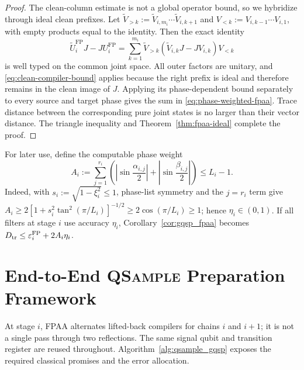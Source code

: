\documentclass[10pt,conference]{IEEEtran}
\theoremstyle{plain}
\theoremstyle{remark}
\begin{document}
\begin{proof}
The clean-column estimate is not a global operator bound, so we
hybridize through ideal clean prefixes.  Let
\(\widetilde V_{>k}:=\widetilde V_{i,m_i}\cdots
\widetilde V_{i,k+1}\) and
\(V_{<k}:=V_{i,k-1}\cdots V_{i,1}\), with empty products equal to
the identity.  Then the exact identity
\[
\widetilde U_i^{\mathrm{FP}}J-JU_i^{\mathrm{FP}}
=\sum_{k=1}^{m_i}
\widetilde V_{>k}(\widetilde V_{i,k}J-JV_{i,k})V_{<k}
\]
is well typed on the common joint space.  All outer factors are
unitary, and \eqref{eq:clean-compiler-bound} applies because the
right prefix is ideal and therefore remains in the clean image of
\(J\).  Applying its phase-dependent bound separately to every
source and target phase gives the sum in
\eqref{eq:phase-weighted-fpaa}.
Trace distance between the corresponding pure joint states is no
larger than their vector distance.  The triangle inequality and
Theorem~\ref{thm:fpaa-ideal} complete the proof.
\end{proof}

For later use, define the computable phase weight
\begin{equation}
\label{eq:phase-weight}
A_i:=
\sum_{j=1}^{r_i}\left(
\left|\sin\frac{\alpha_{i,j}}2\right|
+\left|\sin\frac{\beta_{i,j}}2\right|\right)
\leq L_i-1.
\end{equation}
Indeed, with \(s_i:=\sqrt{1-\xi_i^2}\leq1\), phase-list symmetry and
the \(j=r_i\) term give
\(A_i\geq2[1+s_i^2\tan^2(\pi/L_i)]^{-1/2}
\geq2\cos(\pi/L_i)\geq1\); hence \(\eta_i\in(0,1)\).
If all filters at stage \(i\) use accuracy \(\eta_i\),
Corollary~\ref{cor:gqsp_fpaa} becomes
\(D_{\rm tr}\leq\varepsilon_i^{\rm FP}+2A_i\eta_i\).


\section{End-to-End \textsc{QSample} Preparation Framework}
\label{sec:end-to-end}

At stage \(i\), FPAA alternates lifted-back compilers for chains
\(i\) and \(i+1\); it is not a single pass through two reflections.
The same signal qubit and transition register are reused throughout.
Algorithm~\ref{alg:qsample_gqsp} exposes the required classical
promises and the error allocation.
\end{document}
